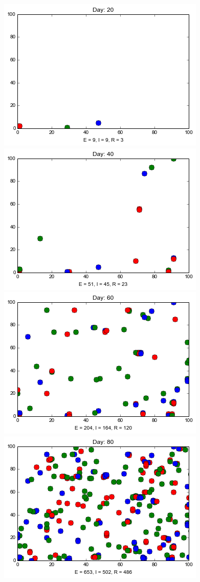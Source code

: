 \begin{minipage}{\linewidth}
\medskip
\includegraphics[scale=0.28]{images/3t20.png} \quad
\includegraphics[scale=0.28]{images/3t40.png} \quad
\includegraphics[scale=0.28]{images/3t60.png} \quad
\includegraphics[scale=0.28]{images/3t80.png} 


\end{minipage}
